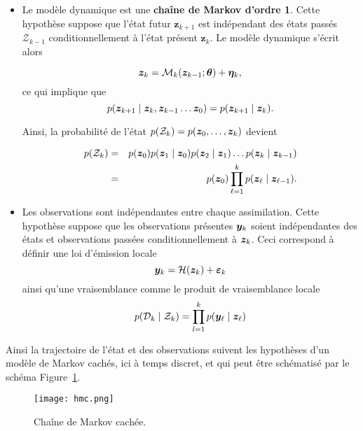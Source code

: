 \begin{itemize}
    \item Le modèle dynamique est une \textbf{chaîne de Markov d'ordre 1}. Cette hypothèse suppose que l'état futur $\bm z_{k+1}$ est indépendant des états passés $\mathcal Z_{k-1}$ conditionnellement à l'état présent $\bm z_{k}$. Le modèle dynamique s'écrit alors

          \begin{equation*}
              \bm z_k = \mathcal{M}_k(\bm z_{k-1} ; \bm \theta) + \bm \eta_k,
          \end{equation*}ce qui implique que
          \begin{equation*}
              p(\bz_{k+1} \mid \bz_{k},\bz_{k-1}\dots \bz_{0}) = p(\bz_{k+1} \mid \bz_{k}).
          \end{equation*}

          Ainsi, la probabilité de l'état $p(\mathcal{Z}_k)=p(\bm z_0, \dots, \bm z_k)$ devient

          \begin{eqnarray*}
              p(\mathcal{Z}_k) &=& p(\bm z_0) p(\bm z_1 \mid \bm z_0) p(\bm z_2 \mid \bm z_1) \dots p(\bm z_k \mid \bm z_{k-1}) \\
              &=& p(\bm z_0) \prod_{\ell = 1}^{k} p(\bm z_\ell \mid \bm z_{\ell-1}).
          \end{eqnarray*}

    \item Les observations sont indépendantes entre chaque assimilation. Cette hypothèse suppose que les observations présentes $\bm{y}_k$ soient indépendantes des états et observations passées conditionnellement à $\bm z_k$. Ceci correspond à définir une loi d'émission locale
          \begin{equation*}
              \bm{y}_k = \mathcal H (\bm z_k) + \bm{\varepsilon}_k
          \end{equation*}
          ainsi qu'une vraisemblance comme le produit de vraisemblance locale
          \begin{equation*}
              p(\mathcal{D}_k \mid \mathcal Z_k) = \prod_{l=1}^{k} p(\bm{y}_\ell \mid \bm z_\ell)
          \end{equation*}
\end{itemize}

Ainsi la trajectoire de l'état et des observations suivent les hypothèses d'un modèle de Markov cachés, ici à temps discret, et qui peut être schématisé par le schéma Figure~\ref{fig:hidden_markov}.

\begin{figure}[h]
    \centering
    \texttt{[image: hmc.png]}
    \caption{Chaîne de Markov cachée.}
    \label{fig:hidden_markov}
\end{figure}

